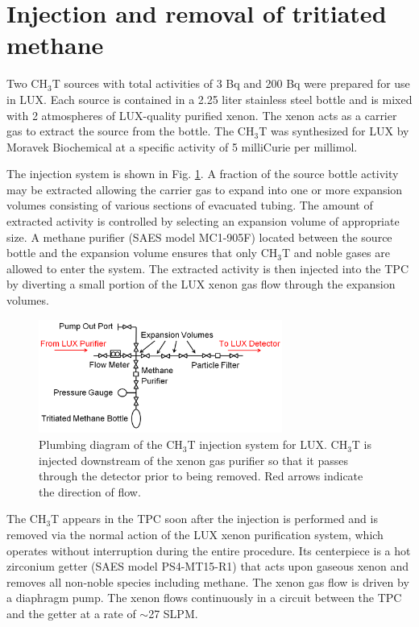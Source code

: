 \section{Injection and removal of tritiated methane}

Two CH$_3$T sources with total activities of 3 Bq and 200 Bq were prepared for use in LUX. Each source is contained in a 2.25 liter stainless steel bottle and is mixed with 2 atmospheres of LUX-quality purified xenon. The xenon acts as a carrier gas to extract the source from the bottle. The CH$_3$T was synthesized for LUX by Moravek Biochemical \cite{moravek} at a specific activity of 5 milliCurie per millimol.

The injection system is shown in Fig. \ref{fig:plumbing}. A fraction of the source bottle activity may be extracted allowing the carrier gas to expand into one or more expansion volumes consisting of various sections of evacuated tubing. The amount of extracted activity is controlled by selecting an expansion volume of appropriate size. A methane purifier (SAES model MC1-905F) located between the source bottle and the expansion volume ensures that only CH$_3$T and noble gases are allowed to enter the system. The extracted activity is then injected into the TPC by diverting a small portion of the LUX xenon gas flow through the expansion volumes. 

\begin{figure}[h!]\centering
\includegraphics[width=80mm]{fig/TritiumPlumbing.png}
\caption{Plumbing diagram of the CH$_3$T injection system for LUX. CH$_3$T is injected downstream of the xenon gas purifier so that it passes through the detector prior to being removed.  Red arrows indicate the direction of flow.}
\label{fig:plumbing}
\end{figure}

The CH$_3$T appears in the TPC soon after the injection is performed and is removed via the normal action of the LUX xenon purification system, which operates without interruption during the entire procedure. Its centerpiece is a hot zirconium getter (SAES model PS4-MT15-R1) that acts upon gaseous xenon and removes all non-noble species including methane. The xenon gas flow is driven by a diaphragm pump. The xenon flows continuously in a circuit between the TPC and the getter at a rate of $\sim$27 SLPM. 

